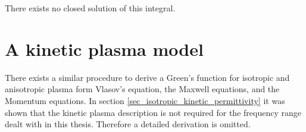 \documentclass[a4paper,11pt]{thesis}
\begin{document}
There exists no closed solution of this integral.

\section{A kinetic plasma model}
There exists a similar procedure to derive a Green's function for isotropic and anisotropic plasma form Vlasov's equation, the Maxwell equations, and the Momentum equations. In section \ref{sec_isotropic_kinetic_permittivity} it was shown that the kinetic plasma description is not required for the frequency range dealt with in this thesis. Therefore a detailed derivation is omitted.





\end{document}
